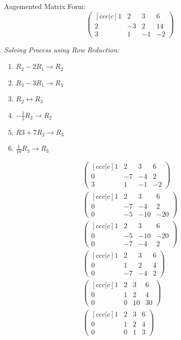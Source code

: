 \noindent
\newline
Augemented Matrix Form:
\begin{equation}
    \begin{pmatrix}[ccc|c]
      1 & 2 & 3 & 6 \\
      2 & -3 & 2 & 14 \\
      3 & 1 & -1 & -2 
    \end{pmatrix}
\end{equation}

\noindent
\newline
\textit{Solving Process using Row Reduction:}
\begin{enumerate}
    \item \(R_2 - 2R_1 \rightarrow R_2\)
    \item \(R_3 - 3R_1 \rightarrow R_3\)
    \item \(R_2 \leftrightarrow R_3\)
    \item \(-\frac{1}{5}R_2 \rightarrow R_2\)
    \item \(R3 + 7R_2 \rightarrow R_3\)
    \item \(\frac{1}{10}R_3 \rightarrow R_3\)
\end{enumerate}

\begin{align}
    \begin{pmatrix}[ccc|c]
      1 & 2 & 3 & 6 \\
      0 & -7 & -4 & 2 \\
      3 & 1 & -1 & -2 
    \end{pmatrix} \\
    \begin{pmatrix}[ccc|c]
      1 & 2 & 3 & 6 \\
      0 & -7 & -4 & 2 \\
      0 & -5 & -10 & -20 
    \end{pmatrix} \\
    \begin{pmatrix}[ccc|c]
      1 & 2 & 3 & 6 \\
      0 & -5 & -10 & -20 \\
      0 & -7 & -4 & 2
    \end{pmatrix} \\
    \begin{pmatrix}[ccc|c]
      1 & 2 & 3 & 6 \\
      0 & 1 & 2 & 4 \\
      0 & -7 & -4 & 2
    \end{pmatrix} \\
    \begin{pmatrix}[ccc|c]
      1 & 2 & 3 & 6 \\
      0 & 1 & 2 & 4 \\
      0 & 0 & 10 & 30
    \end{pmatrix} \\
    \begin{pmatrix}[ccc|c]
      1 & 2 & 3 & 6 \\
      0 & 1 & 2 & 4 \\
      0 & 0 & 1 & 3
    \end{pmatrix}
\end{align}

